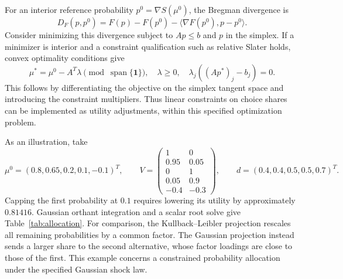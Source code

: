 \documentclass[11pt]{amsart}
\theoremstyle{definition}\newtheorem{example}[theorem]{Example}
\theoremstyle{remark}\newtheorem{remark}[theorem]{Remark}
\newcommand{\one}{\mathbf 1}\newcommand{\diag}{\operatorname{diag}}
\begin{document}
For an interior reference probability $p^0=\nabla S(\mu^0)$, the Bregman divergence is
\[
 D_F(p,p^0)=F(p)-F(p^0)-\langle\nabla F(p^0),p-p^0\rangle.
\]
Consider minimizing this divergence subject to $Ap\leq b$ and $p$ in the simplex. If a minimizer is interior and a constraint qualification such as relative Slater holds, convex optimality conditions give
\begin{equation}\label{eq:tax}
 \mu^*=\mu^0-A^T\lambda\pmod{\operatorname{span}\{\one\}},\quad
 \lambda\geq0,\quad \lambda_j((Ap^*)_j-b_j)=0.
\end{equation}
This follows by differentiating the objective on the simplex tangent space and introducing the constraint multipliers. Thus linear constraints on choice shares can be implemented as utility adjustments, within this specified optimization problem.

As an illustration, take
\[
 \mu^0=(0.8,0.65,0.2,0.1,-0.1)^T,\qquad
 V=\begin{pmatrix}1&0\\0.95&0.05\\0&1\\0.05&0.9\\-0.4&-0.3\end{pmatrix},\qquad
 d=(0.4,0.4,0.5,0.5,0.7)^T.
\]
Capping the first probability at $0.1$ requires lowering its utility by approximately $0.81416$. Gaussian orthant integration and a scalar root solve give Table~\ref{tab:allocation}. For comparison, the Kullback--Leibler projection rescales all remaining probabilities by a common factor. The Gaussian projection instead sends a larger share to the second alternative, whose factor loadings are close to those of the first. This example concerns a constrained probability allocation under the specified Gaussian shock law.
\begin{table}[htbp]\centering\small

\caption{An interior probability allocation with the constraint $p_1\leq0.1$. The Gaussian and KL columns minimize different divergences from the same baseline.}\label{tab:allocation}
\end{table}
\end{document}
